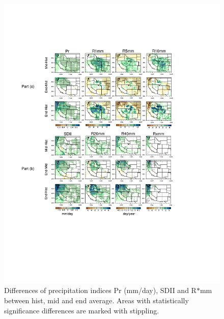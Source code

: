 \documentclass{ametsoc}
\begin{document}
\begin{figure}
\begin{center}
\includegraphics[width=6in, trim={3.5cm 6.5cm 3.5cm 2.0cm},clip]{wd_index_all_years_part1.pdf} %
\caption{Differences of precipitation indices Pr (mm/day), SDII and R$\ast$mm between \textsf{hist}, \textsf{mid} and \textsf{end} average.  Areas with statistically significance differences are marked with stippling.}
\label{fig:difIndex1}
\end{center}
\end{figure}
\end{document}
